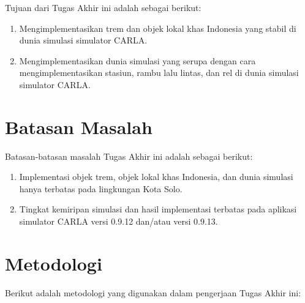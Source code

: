 Tujuan dari Tugas Akhir ini adalah sebagai berikut:

\begin{enumerate}

    \item Mengimplementasikan trem dan objek lokal khas Indonesia yang stabil di
    dunia simulasi simulator CARLA.

    \item Mengimplementasikan dunia simulasi yang serupa dengan cara
    mengimplementasikan stasiun, rambu lalu lintas, dan rel di dunia simulasi
    simulator CARLA.


\end{enumerate}

\section{Batasan Masalah}

Batasan-batasan masalah Tugas Akhir ini adalah sebagai berikut:

\begin{enumerate}

    \item Implementasi objek trem, objek lokal khas Indonesia, dan dunia
    simulasi hanya terbatas pada lingkungan Kota Solo.

    \item Tingkat kemiripan simulasi dan hasil implementasi terbatas pada
    aplikasi simulator CARLA versi 0.9.12 dan/atau versi 0.9.13.


\end{enumerate}

\section{Metodologi}

Berikut adalah metodologi yang digunakan dalam pengerjaan Tugas Akhir ini:

